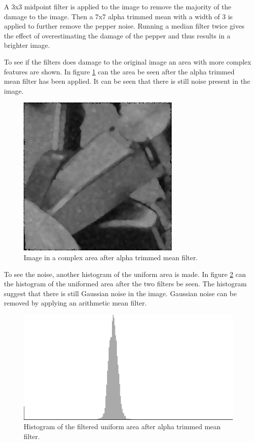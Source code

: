 A 3x3 midpoint filter is applied to the image to remove the majority of the damage to the image.
Then a 7x7 alpha trimmed mean with a width of 3 is applied to further remove the pepper noise.
Running a median filter twice gives the effect of overestimating the damage of the pepper and thus results in a brighter image.

To see if the filters does damage to the original image an area with more complex features are shown.
In figure \ref{fig:complex1_after_alpha} can the area be seen after the alpha trimmed mean filter has been applied.
It can be seen that there is still noise present in the image.

\begin{figure}[H]
\centering
\includegraphics[width = \cutOutWidth]{graphics/complex1_step2}
\caption{Image in a complex area after alpha trimmed mean filter.}
\label{fig:complex1_after_alpha}
\end{figure}

To see the noise, another histogram of the uniform area is made.
In figure \ref{fig:hist_img1_after_alpha} can the histogram of the uniformed area after the two filters be seen.
The histogram suggest that there is still Gaussian noise in the image.
Gaussian noise can be removed by applying an arithmetic mean filter.

\begin{figure}[H]
\centering
\includegraphics[width = \histogramWidth]{graphics/hist1_uniform2.png}
\caption{Histogram of the filtered uniform area after alpha trimmed mean filter.}
\label{fig:hist_img1_after_alpha}
\end{figure}

